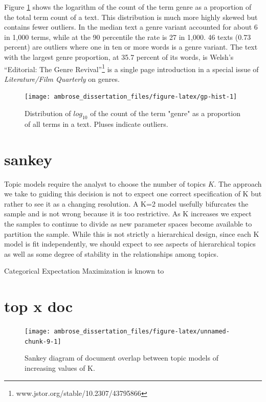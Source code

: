 \documentclass[]{book}
\let\rmarkdownfootnote\footnote%
\def\footnote{\protect\rmarkdownfootnote}
\theoremstyle{definition}
\theoremstyle{definition}
\theoremstyle{definition}
\theoremstyle{remark}
\begin{document}
Figure \ref{fig:gp-hist} shows the logarithm of the count of the term
genre as a proportion of the total term count of a text. This
distribution is much more highly skewed but contains fewer outliers. In
the median text a genre variant accounted for about 6 in 1,000 terms,
while at the 90 percentile the rate is 27 in 1,000. 46 texts (0.73
percent) are outliers where one in ten or more words is a genre variant.
The text with the largest genre proportion, at 35.7 percent of its
words, is Welsh's ``Editorial: The Genre Revival''\footnote{www.jstor.org/stable/10.2307/43795866}
is a single page introduction in a special issue of
\emph{Literature/Film Quarterly} on genres.

\begin{figure}

{\centering \texttt{[image: ambrose\_dissertation\_files/figure-latex/gp-hist-1]} 

}

\caption{Distribution of $log_{10}$ of the count of the term "genre" as a proportion of all terms in a text. Pluses indicate outliers.}\label{fig:gp-hist}
\end{figure}

\hypertarget{sankey}{%
\section{sankey}\label{sankey}}

Topic models require the analyst to choose the number of topics \(K\).
The approach we take to guiding this decision is not to expect one
correct specification of K but rather to see it as a changing
resolution. A K=2 model usefully bifurcates the sample and is not wrong
because it is too restrictive. As K increases we expect the samples to
continue to divide as new parameter spaces become available to partition
the sample. While this is not strictly a hierarchical design, since each
K model is fit independently, we should expect to see aspects of
hierarchical topics as well as some degree of stability in the
relationships among topics.

Categorical Expectation Maximization is known to

\hypertarget{top-x-doc}{%
\section{top x doc}\label{top-x-doc}}

\begin{figure}

{\centering \texttt{[image: ambrose\_dissertation\_files/figure-latex/unnamed-chunk-9-1]} 

}

\caption{Sankey diagram of document overlap between topic models of increasing values of K.}\label{fig:unnamed-chunk-9}
\end{figure}
\end{document}
